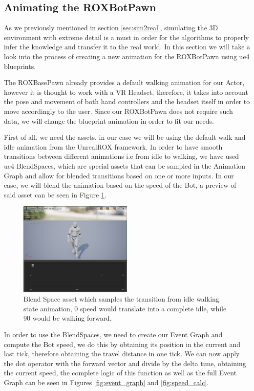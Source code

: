 \subsection{Animating the ROXBotPawn}
As we previously mentioned in section \ref{sec:sim2real}, simulating the 3D environment with extreme detail is a must in order for the algorithms to properly infer the knowledge and transfer it to the real world. In this section we will take a look into the process of creating a new animation for the ROXBotPawn using \gls{ue4} blueprints.

The ROXBasePawn already provides a default walking animation for our Actor, however it is thought to work with a VR Headset, therefore, it takes into account the pose and movement of both hand controllers and the headset itself in order to move accordingly to the user. Since our ROXBotPawn does not require such data, we will change the blueprint animation in order to fit our needs. 

First of all, we need the assets, in our case we will be using the default walk and idle animation from the UnrealROX framework. In order to have smooth transitions between different animations i.e from idle to walking, we have used \gls{ue4} BlendSpaces, which are special assets that can be sampled in the Animation Graph and allow for blended transitions based on one or more inputs. In our case,  we will blend the animation based on the speed of the Bot, a preview of said asset can be seen in Figure \ref{fig:blend_space}.

\begin{figure}[h]
	\includegraphics[width=0.5\textwidth]{archivos/blend_space.png}
	\centering
	\caption{Blend Space asset which samples the transition from idle walking state animation, 0 speed would translate into a complete idle, while 90 would be walking forward.}
	\label{fig:blend_space}
\end{figure}

In order to use the BlendSpaces, we need to create our Event Graph and compute the Bot speed, we do this by obtaining its position in the current and last tick, therefore obtaining the travel distance in one tick. We can now apply the dot operator with the forward vector and divide by the delta time, obtaining the current speed, the complete logic of this function as well as the full Event Graph can be seen in Figures \ref{fig:event_graph} and \ref{fig:speed_calc}.

